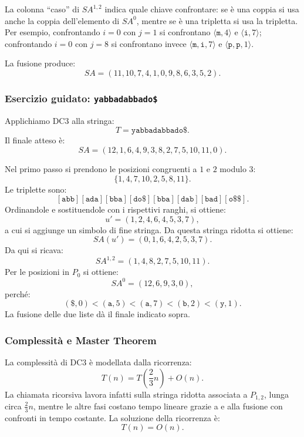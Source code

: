 \documentclass{article}
\theoremstyle{definition}
\numberwithin{equation}{section}
\begin{document}
La colonna ``caso'' di $SA^{1,2}$ indica quale chiave confrontare: se è una coppia si usa anche la coppia dell'elemento di $SA^0$, mentre se è una tripletta si usa la tripletta. Per esempio, confrontando $i=0$ con $j=1$ si confrontano $\langle\texttt{m},4\rangle$ e $\langle\texttt{i},7\rangle$; confrontando $i=0$ con $j=8$ si confrontano invece $\langle\texttt{m},\texttt{i},7\rangle$ e $\langle\texttt{p},\texttt{p},1\rangle$.

La fusione produce:
\[
    SA=(11,10,7,4,1,0,9,8,6,3,5,2).
\]

\subsubsection{Esercizio guidato: \texttt{yabbadabbado\$}}
Applichiamo DC3 alla stringa:
\[
    T=\texttt{yabbadabbado\$}.
\]
Il  finale atteso è:
\[
    SA=(12,1,6,4,9,3,8,2,7,5,10,11,0).
\]

Nel primo passo si prendono le posizioni congruenti a $1$ e $2$ modulo $3$:
\[
    \{1,4,7,10,2,5,8,11\}.
\]
Le triplette sono:
\[
    [\texttt{abb}]
    [\texttt{ada}]
    [\texttt{bba}]
    [\texttt{do\$}]
    [\texttt{bba}]
    [\texttt{dab}]
    [\texttt{bad}]
    [\texttt{o\$\$}].
\]
Ordinandole e sostituendole con i rispettivi ranghi, si ottiene:
\[
    u'=(1,2,4,6,4,5,3,7),
\]
a cui si aggiunge un simbolo di fine stringa. Da questa stringa ridotta si ottiene:
\[
    SA(u')=(0,1,6,4,2,5,3,7).
\]
Da qui si ricava:
\[
    SA^{1,2}=(1,4,8,2,7,5,10,11).
\]
Per le posizioni in $P_0$ si ottiene:
\[
    SA^0=(12,6,9,3,0),
\]
perché:
\[
    (\texttt{\$},0)<(\texttt{a},5)<(\texttt{a},7)<(\texttt{b},2)<(\texttt{y},1).
\]
La fusione delle due liste dà il  finale indicato sopra.

\subsubsection{Complessità e Master Theorem}
La complessità di DC3 è modellata dalla ricorrenza:
\begin{equation}\label{eq:dc3_recurrence}
    T(n)=T\left(\frac{2}{3}n\right)+O(n).
\end{equation}
La chiamata ricorsiva lavora infatti sulla stringa ridotta associata a $P_{1,2}$, lunga circa $\frac{2}{3}n$, mentre le altre fasi costano tempo lineare grazie a  e alla fusione con confronti in tempo costante. La soluzione della ricorrenza è:
\[
    T(n)=O(n).
\]
\end{document}
